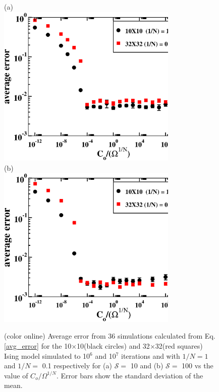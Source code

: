\documentclass[aps,pre,reprint,superscriptaddress,showkeys]{revtex4-2}
\begin{document}
\begin{figure}[h!]
(a)\\
\vspace{1cm}
\includegraphics[width=8.6cm]{fig3a.eps}\\
\vspace{1cm}
(b)\\
\vspace{1cm}
\includegraphics[width=8.6cm]{fig3b.eps}\\
\caption{(color online) Average error from 36 simulations calculated from Eq. \ref{avg_error} for the 10$\times$10(black circles) and 32$\times$32(red squares) Ising model simulated to 10$^6$ and 10$^7$ iterations and  with $1/N=1$ and $1/N=$ 0.1 respectively for (a)  $\mathcal{S}=$ 10 and (b) $\mathcal{S}=$ 100 vs the value of $C_{o}/\Omega^{1/N}$. Error bars show the standard deviation of the mean.  \label{optimalCo}}
\end{figure}
\end{document}
